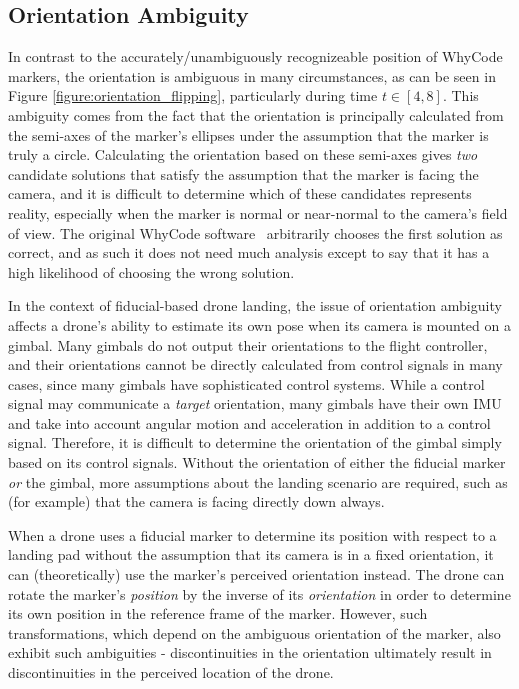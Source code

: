 \subsection{Orientation Ambiguity}

In contrast to the accurately/unambiguously recognizeable position of WhyCode markers, the orientation
is ambiguous in many circumstances, as can be seen in Figure \ref{figure:orientation_flipping},
particularly during time $t \in [4,8]$.
This ambiguity comes from the fact that the orientation is principally calculated from the semi-axes of the
marker's ellipses under the assumption that the marker is truly a circle.
Calculating the orientation based on these semi-axes gives \textit{two} candidate solutions
that satisfy the assumption that the marker is facing the camera,
and it is difficult to determine which of these candidates represents reality,
especially when the marker is normal or near-normal to the camera's field of view.
The original WhyCode software~\cite{LCAS_whycon} arbitrarily chooses the first solution as correct,
and as such it does not need much analysis except to say that it has a high likelihood of choosing the wrong solution.

In the context of fiducial-based drone landing, the issue of orientation ambiguity affects a drone's ability to
estimate its own pose when its camera is mounted on a gimbal.
Many gimbals do not output their orientations to the flight controller, and their orientations cannot be directly
calculated from control signals in many cases, since many gimbals have sophisticated control systems.
While a control signal may communicate a \textit{target} orientation,
many gimbals have their own IMU and take into account angular motion and acceleration in addition to a control signal.
Therefore, it is difficult to determine the orientation of the gimbal simply based on its control signals.
Without the orientation of either the fiducial marker \textit{or} the gimbal, more assumptions about
the landing scenario are required, such as (for example) that the camera is facing directly down always.

When a drone uses a fiducial marker to determine its position with respect to a landing pad without the assumption
that its camera is in a fixed orientation, it can (theoretically) use the marker's perceived orientation instead.
The drone can rotate the marker's \textit{position} by the inverse of its \textit{orientation} in order to determine
its own position in the reference frame of the marker.
However, such transformations, which depend on the ambiguous orientation of the marker, also exhibit such ambiguities -
discontinuities in the orientation ultimately result in discontinuities in the perceived location of the drone.

